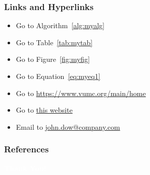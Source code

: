 \documentclass[leqno]{beamer}
\begin{document}
	\begin{frame}
		\frametitle{Links and Hyperlinks}
		\begin{itemize}
			\item Go to Algorithm~\ref{alg:myalg}
			\item Go to Table~\ref{tab:mytab}
			\item Go to Figure~\ref{fig:myfig}
			\item Go to Equation~\eqref{eq:myeq1}
			\item Go to \url{https://www.vumc.org/main/home}
			\item Go to \href{https://www.vumc.org/main/home}{this 
			website}
			\item Email to 
			\href{mailto:john.dow@company.com}{john.dow@company.com}
		\end{itemize}
	\end{frame}
	
	\begin{frame}[allowframebreaks]
		\frametitle{References}
		\nocite{*}
		
		
	\end{frame}
	
	{
		\begin{frame}[plain]
			\begin{center}
			{\huge \bfseries \textcolor{white}{Thank You!}}
		\end{center}
		\end{frame}
	}
\end{document}
